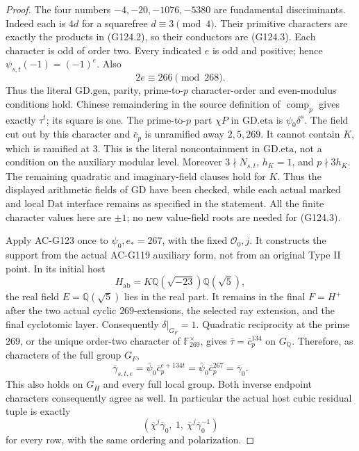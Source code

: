 \begin{proof}
The four numbers \(-4,-20,-1076,-5380\) are fundamental
discriminants.  Indeed each is \(4d\) for a squarefree
\(d\equiv3\pmod4\).  Their primitive characters are exactly the
products in (G124.2), so their conductors are (G124.3).  Each
character is odd of order two.  Every indicated \(e\) is odd and
positive; hence \(\psi_{s,t}(-1)=(-1)^e\).  Also
\[
                2e\equiv266\pmod {268}.
 \tag{G124.11}
\]
Thus the literal \(\mathrm{GD.gen}\), parity, prime-to-\(p\)
character-order and even-modulus conditions hold.
Chinese remaindering in the source definition of
\(\operatorname{comp}_p\) gives exactly \(\tau^t\); its square
is one.  The prime-to-\(p\) part \(\chi P\) in
\(\mathrm{GD.eta}\) is \(\psi_0\delta^s\).
The field cut out by this character and \(\bar c_p\) is unramified
away \(2,5,269\).  It cannot contain \(K\), which is ramified
at \(3\).  This is the literal noncontainment in
\(\mathrm{GD.eta}\), not a condition on the auxiliary modular
level.  Moreover \(3\nmid N_{s,t}\), \(h_K=1\), and
\(p\nmid3h_K\).  The remaining quadratic and imaginary-field
clauses hold for \(K\).  Thus the displayed arithmetic fields of
\(\mathrm{GD}\) have been checked, while each actual marked and
local \(\mathrm{Dat}\) interface remains as specified in the
statement.  All the finite character values here are \(\pm1\);
no new value-field roots are needed for (G124.3).

Apply AC-G123 once to \(\psi_0,e_*=267\), with the fixed
\(\mathcal O_0,j\).  It constructs the support from the actual
AC-G119 auxiliary form, not from an original Type II point.
In its initial host
\[
 H_{\mathrm{ab}}
   =K\mathbb Q(\sqrt{-23})\mathbb Q(\sqrt5),
 \tag{G124.12}
\]
the real field \(E=\mathbb Q(\sqrt5)\) lies in the real part.
It remains in the final \(F=H^+\) after the two actual cyclic
\(269\)-extensions, the selected ray extension, and the final
cyclotomic layer.  Consequently \(\delta|_{G_F}=1\).
Quadratic reciprocity at the prime \(269\), or the unique order-two
character of \(\mathbb F_{269}^{\times}\), gives
\(\bar\tau=\bar c_p^{134}\) on \(G_{\mathbb Q}\).
Therefore, as characters of the full group \(G_F\),
\[
 \bar\gamma_{s,t,e}
    =\bar\psi_0\bar c_p^{e+134t}
    =\bar\psi_0\bar c_p^{267}
    =\bar\gamma_0.
 \tag{G124.13}
\]
This also holds on \(G_H\) and every full local group.
Both inverse endpoint characters consequently agree as well.
In particular the actual host cubic residual tuple is exactly
\[
 (\bar\chi^j\bar\gamma_0,\ 1,\ \bar\chi^j\bar\gamma_0^{-1})
 \tag{G124.14}
\]
for every row, with the same ordering and polarization.


\end{proof}
